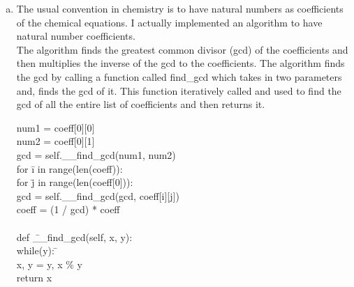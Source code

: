 \documentclass[12pt]{article}
\begin{document}
\begin{enumerate}[a)]
\begin{tabbing}
	\> def \= mass(self): \+ \\
	\> return self.mass\\
\end{tabbing}

In the class Chemical Entity, I would include another abstract method called get\_molar\_mass().
This method would take in ElementT, used ElementT.H.mass to get the molar mass and return it as a real number.
For MoleculeT, it would get the molar mass using the element and multiply the number it with the number of atoms in the molecule. Hence getting the mass.
For CompoundT, it would iterate though each molecule and use the function get\_molar\_mass of the molecule to get the mass of each molecule, have a variable which adds and stores the molar mass of each molecule and then when the iteration ends returns it.

\item The usual convention in chemistry is to have natural numbers as coefficients of the chemical equations. I actually implemented an algorithm to have natural number coefficients. \\
The algorithm finds the greatest common divisor (gcd) of the coefficients and then multiplies the inverse of the gcd to the coefficients. The algorithm finds the gcd by calling a function called find\_gcd which takes in two parameters and, finds the gcd of it. This function iteratively called and used to find the gcd of all the entire list of coefficients and then returns it.


\begin{tabbing}
		num1 = coeff[0][0]\\
		num2 = coeff[0][1]\\
       gcd = self.\_\_find\_gcd(num1, num2)\\
       for \= i in range(len(coeff)):\\
            \> for \= j in range(len(coeff[0])):\+ \\
               \>  gcd = self.\_\_find\_gcd(gcd, coeff[i][j])\\
        coeff = (1 / gcd) * coeff \- \\ \\

		def \= \_\_find\_gcd(self, x, y):\\
        \> while(y): \= \+ \\
            \> x, y = y, x \% y\\
        	  return x\\
\end{tabbing}


\end{enumerate}
\end{document}
